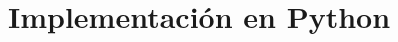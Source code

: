 \documentclass[aspectratio=169, 10pt]{beamer}
\begin{document}
\section{Implementación en Python}

\end{document}
